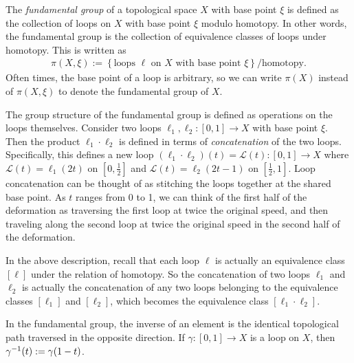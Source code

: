 \begin{definition}
    The \textit{fundamental group} of a topological space $X$ with base point $\xi$ is defined as the collection of loops on $X$ with base point $\xi$ modulo homotopy. In other words, the fundamental group is the collection of equivalence classes of loops under homotopy. This is written as
    \begin{align*}
        \pi(X,\xi):=\left\{ \textrm{loops }\ell \textrm{ on }X \textrm{ with base point }\xi \right\}/\textrm{homotopy}.
    \end{align*}
    Often times, the base point of a loop is arbitrary, so we can write $\pi(X)$ instead of $\pi(X,\xi)$ to denote the fundamental group of $X$.
\end{definition}

The group structure of the fundamental group is defined as operations on the loops themselves. Consider two loops $\ell_1,\ell_2:[0,1]\to X$ with base point $\xi$. Then the product $\ell_1\cdot\ell_2$ is defined in terms of \textit{concatenation} of the two loops. Specifically, this defines a new loop $(\ell_1\cdot\ell_2)(t)=\mathcal{L}(t):[0,1]\to X$ where $\mathcal{L}(t) = \ell_1(2t)$ on $\left[ 0,\frac{1}{2} \right]$ and $\mathcal{L}(t) = \ell_2(2t-1)$ on $\left[ \frac{1}{2},1 \right]$. Loop concatenation can be thought of as stitching the loops together at the shared base point. As $t$ ranges from 0 to 1, we can think of the first half of the deformation as traversing the first loop at twice the original speed, and then traveling along the second loop at twice the original speed in the second half of the deformation. 

In the above description, recall that each loop $\ell$ is actually an equivalence class $\left[ \ell \right]$ under the relation of homotopy. So the concatenation of two loops $\ell_1$ and $\ell_2$ is actually the concatenation of any two loops belonging to the equivalence classes $\left[ \ell_1 \right]$ and $\left[ \ell_2 \right]$, which becomes the equivalence class $\left[ \ell_1\cdot\ell_2 \right]$.

In the fundamental group, the inverse of an element is the identical topological path traversed in the opposite direction. If $\gamma:[0,1]\to X$ is a loop on $X$, then ${ \gamma }^{-1}(t) := \gamma(1-t)$.


